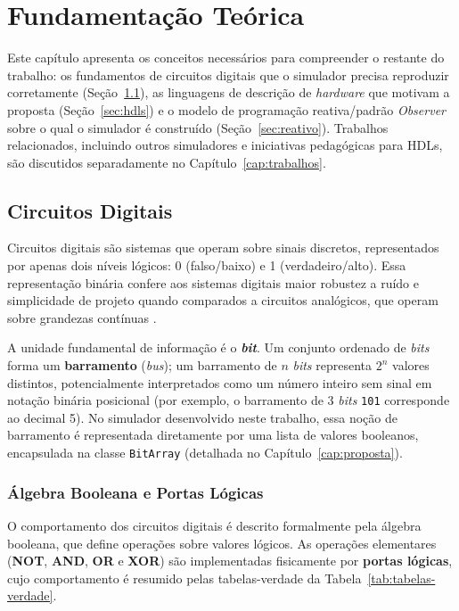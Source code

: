 \chapter{Fundamentação Teórica}
\label{cap:fundamentacao}

Este capítulo apresenta os conceitos necessários para compreender o restante do trabalho: os fundamentos de circuitos digitais que o simulador precisa reproduzir corretamente (Seção~\ref{sec:circuitos-digitais}), as linguagens de descrição de \textit{hardware} que motivam a proposta (Seção~\ref{sec:hdls}) e o modelo de programação reativa/padrão \textit{Observer} sobre o qual o simulador é construído (Seção~\ref{sec:reativo}). Trabalhos relacionados, incluindo outros simuladores e iniciativas pedagógicas para HDLs, são discutidos separadamente no Capítulo~\ref{cap:trabalhos}.

\section{Circuitos Digitais}
\label{sec:circuitos-digitais}

Circuitos digitais são sistemas que operam sobre sinais discretos, representados por apenas dois níveis lógicos: 0 (falso/baixo) e 1 (verdadeiro/alto). Essa representação binária confere aos sistemas digitais maior robustez a ruído e simplicidade de projeto quando comparados a circuitos analógicos, que operam sobre grandezas contínuas \cite{tocci2011, floyd2007}.

A unidade fundamental de informação é o \textbf{\textit{bit}}. Um conjunto ordenado de \textit{bits} forma um \textbf{barramento} (\textit{bus}); um barramento de $n$ \textit{bits} representa $2^n$ valores distintos, potencialmente interpretados como um número inteiro sem sinal em notação binária posicional (por exemplo, o barramento de 3 \textit{bits} \texttt{101} corresponde ao decimal 5). No simulador desenvolvido neste trabalho, essa noção de barramento é representada diretamente por uma lista de valores booleanos, encapsulada na classe \texttt{BitArray} (detalhada no Capítulo~\ref{cap:proposta}).

\subsection{Álgebra Booleana e Portas Lógicas}
\label{sec:algebra-booleana}

O comportamento dos circuitos digitais é descrito formalmente pela álgebra booleana, que define operações sobre valores lógicos. As operações elementares (\textbf{NOT}, \textbf{AND}, \textbf{OR} e \textbf{XOR}) são implementadas fisicamente por \textbf{portas lógicas}, cujo comportamento é resumido pelas tabelas-verdade da Tabela~\ref{tab:tabelas-verdade}.

